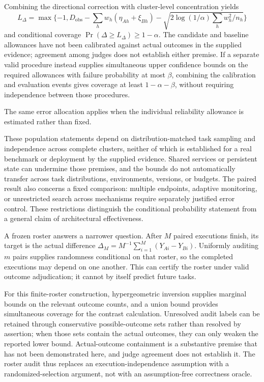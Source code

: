 \documentclass[11pt]{article}
\begin{document}
Combining the directional correction with cluster-level concentration yields \[L_\Delta=\max\{-1,D_{\mathrm{obs}}-\sum_h w_h(\eta_{Ah}+\xi_{Bh})-\sqrt{2\log(1/\alpha)\sum_h w_h^2/n_h}\}\] and conditional coverage $\Pr(\Delta\geq L_\Delta)\geq1-\alpha$. The candidate and baseline allowances have not been calibrated against actual outcomes in the supplied evidence; agreement among judges does not establish either premise. If a separate valid procedure instead supplies simultaneous upper confidence bounds on the required allowances with failure probability at most $\beta$, combining the calibration and evaluation events gives coverage at least $1-\alpha-\beta$, without requiring independence between those procedures.

The same error allocation applies when the individual reliability allowance is estimated rather than fixed.

These population statements depend on distribution-matched task sampling and independence across complete clusters, neither of which is established for a real benchmark or deployment by the supplied evidence. Shared services or persistent state can undermine those premises, and the bounds do not automatically transfer across task distributions, environments, versions, or budgets. The paired result also concerns a fixed comparison: multiple endpoints, adaptive monitoring, or unrestricted search across mechanisms require separately justified error control. These restrictions distinguish the conditional probability statement from a general claim of architectural effectiveness.

A frozen roster answers a narrower question. After $M$ paired executions finish, its target is the actual difference $\Delta_M=M^{-1}\sum_{i=1}^{M}(Y_{Ai}-Y_{Bi})$. Uniformly auditing $m$ pairs supplies randomness conditional on that roster, so the completed executions may depend on one another. This can certify the roster under valid outcome adjudication; it cannot by itself predict future tasks.

For this finite-roster construction, hypergeometric inversion supplies marginal bounds on the relevant outcome counts, and a union bound provides simultaneous coverage for the contrast calculation. Unresolved audit labels can be retained through conservative possible-outcome sets rather than resolved by assertion; when those sets contain the actual outcomes, they can only weaken the reported lower bound. Actual-outcome containment is a substantive premise that has not been demonstrated here, and judge agreement does not establish it. The roster audit thus replaces an execution-independence assumption with a randomized-selection argument, not with an assumption-free correctness oracle.
\end{document}
